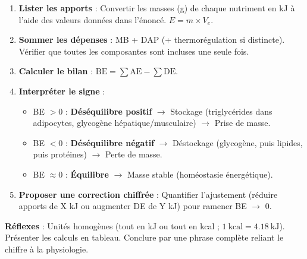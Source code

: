 \documentclass[11pt]{article}
\begin{document}
\begin{methode}
\begin{enumerate}
\item \textbf{Lister les apports} : Convertir les masses (g) de chaque nutriment en kJ à l'aide des valeurs données dans l'énoncé. $E = m \times V_e$.
\item \textbf{Sommer les dépenses} : MB + DAP (+ thermorégulation si distincte). Vérifier que toutes les composantes sont incluses une seule fois.
\item \textbf{Calculer le bilan} : $\text{BE} = \sum \text{AE} - \sum \text{DE}$.
\item \textbf{Interpréter le signe} :
\begin{itemize}
\item BE $> 0$ : \textbf{Déséquilibre positif} $\rightarrow$ Stockage (triglycérides dans adipocytes, glycogène hépatique/musculaire) $\rightarrow$ Prise de masse.
\item BE $< 0$ : \textbf{Déséquilibre négatif} $\rightarrow$ Déstockage (glycogène, puis lipides, puis protéines) $\rightarrow$ Perte de masse.
\item BE $\approx 0$ : \textbf{Équilibre} $\rightarrow$ Masse stable (homéostasie énergétique).
\end{itemize}
\item \textbf{Proposer une correction chiffrée} : Quantifier l'ajustement (réduire apports de X kJ ou augmenter DE de Y kJ) pour ramener BE $\rightarrow$ 0.
\end{enumerate}
\textbf{Réflexes} : Unités homogènes (tout en kJ ou tout en kcal ; $1\ \text{kcal} = \num{4,18}\ \text{kJ}$). Présenter les calculs en tableau. Conclure par une phrase complète reliant le chiffre à la physiologie.
\end{methode}
\end{document}
